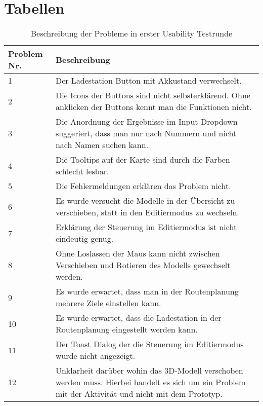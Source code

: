 \section{Tabellen}
\begin{table}[H]
    \caption{Beschreibung der Probleme in erster Usability Testrunde}\label{tbl:1stUsabilityTestsProblemsDesc}
    \begin{tabular}{l|l}
        Problem Nr. & Beschreibung \\ \hline
        1           & \multicolumn{1}{p{12cm}}{Der Ladestation Button mit Akkustand verwechselt.} \\ \hline
        2           & \multicolumn{1}{p{12cm}}{Die Icons der Buttons sind nicht selbsterklärend. Ohne anklicken der Buttons kennt man die Funktionen nicht.} \\ \hline
        3           & \multicolumn{1}{p{12cm}}{Die Anordnung der Ergebnisse im Input Dropdown suggeriert, dass man nur nach Nummern und nicht nach Namen suchen kann.} \\ \hline
        4           & \multicolumn{1}{p{12cm}}{Die Tooltips auf der Karte sind durch die Farben schlecht lesbar.} \\ \hline
        5           & \multicolumn{1}{p{12cm}}{Die Fehlermeldungen erklären das Problem nicht.} \\ \hline
        6           & \multicolumn{1}{p{12cm}}{Es wurde versucht die Modelle in der Übersicht zu verschieben, statt in den Editiermodus zu wechseln.} \\ \hline
        7           & \multicolumn{1}{p{12cm}}{Erklärung der Steuerung im Editiermodus ist nicht eindeutig genug.} \\ \hline
        8           & \multicolumn{1}{p{12cm}}{Ohne Loslassen der Maus kann nicht zwischen Verschieben und Rotieren des Modells gewechselt werden.} \\ \hline
        9           & \multicolumn{1}{p{12cm}}{Es wurde erwartet, dass man in der Routenplanung mehrere Ziele einstellen kann.} \\ \hline
        10          & \multicolumn{1}{p{12cm}}{Es wurde erwartet, dass die Ladestation in der Routenplanung eingestellt werden kann.} \\ \hline
        11          & \multicolumn{1}{p{12cm}}{Der Toast Dialog der die Steuerung im Editiermodus wurde nicht angezeigt.} \\ \hline
        12          & \multicolumn{1}{p{12cm}}{Unklarheit darüber wohin das 3D-Modell verschoben werden muss. Hierbei handelt es sich um ein Problem mit der Aktivität und nicht mit dem Prototyp.} \\ \hline

\end{tabular}
\end{table}

